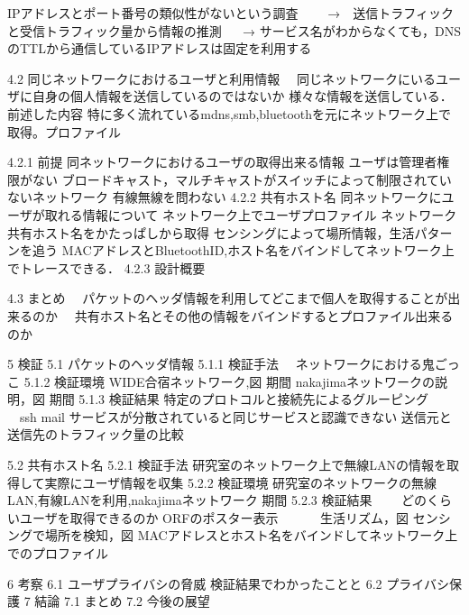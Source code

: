    IPアドレスとポート番号の類似性がないという調査
　　→　送信トラフィックと受信トラフィック量から情報の推測
 　 →  サービス名がわからなくても，DNSのTTLから通信しているIPアドレスは固定を利用する


 4.2 同じネットワークにおけるユーザと利用情報
　同じネットワークにいるユーザに自身の個人情報を送信しているのではないか
  様々な情報を送信している．前述した内容
  特に多く流れているmdns,smb,bluetoothを元にネットワーク上で取得。プロファイル
 
 4.2.1 前提
   同ネットワークにおけるユーザの取得出来る情報
   ユーザは管理者権限がない
   ブロードキャスト，マルチキャストがスイッチによって制限されていないネットワーク
   有線無線を問わない
  4.2.2 共有ホスト名
   同ネットワークにユーザが取れる情報について
   ネットワーク上でユーザプロファイル
   ネットワーク共有ホスト名をかたっぱしから取得 
   センシングによって場所情報，生活パターンを追う
   MACアドレスとBluetoothID,ホスト名をバインドしてネットワーク上でトレースできる．
  4.2.3 設計概要

4.3 まとめ
　パケットのヘッダ情報を利用してどこまで個人を取得することが出来るのか
　共有ホスト名とその他の情報をバインドするとプロファイル出来るのか


5 検証
 5.1 パケットのヘッダ情報
 5.1.1 検証手法
 　ネットワークにおける鬼ごっこ
 5.1.2 検証環境
   WIDE合宿ネットワーク,図
   期間
   nakajimaネットワークの説明，図
   期間
 5.1.3 検証結果
   特定のプロトコルと接続先によるグルーピング
   　ssh
     mail
   サービスが分散されていると同じサービスと認識できない
   送信元と送信先のトラフィック量の比較


5.2 共有ホスト名
 5.2.1 検証手法
  研究室のネットワーク上で無線LANの情報を取得して実際にユーザ情報を収集
 5.2.2 検証環境
   研究室のネットワークの無線LAN,有線LANを利用,nakajimaネットワーク
   期間
 5.2.3 検証結果
　　どのくらいユーザを取得できるのか
     ORFのポスター表示
　　　生活リズム，図
      センシングで場所を検知，図
    MACアドレスとホスト名をバインドしてネットワーク上でのプロファイル

6 考察
 6.1 ユーザプライバシの脅威
  検証結果でわかったことと
 6.2 プライバシ保護
7 結論
 7.1 まとめ
 7.2 今後の展望
